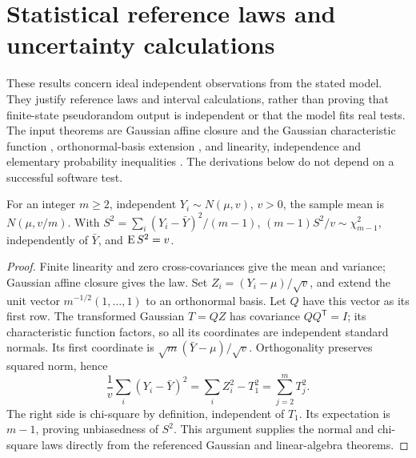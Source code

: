 \chapter{Statistical reference laws and uncertainty calculations}
\label{sec:shared-statistical-methods}
\label{sec:simulation-statistical-methods}

These results concern ideal independent observations from the stated model.
They justify reference laws and interval calculations, rather than proving
that finite-state pseudorandom output is independent or that the model fits
real tests. The input theorems are Gaussian affine closure and the Gaussian
characteristic function \citep[Theorems 3.3.1--3.3.2]{gallager2013},
orthonormal-basis extension \citep[Theorem 6.36]{axler2024}, and linearity,
independence and elementary probability inequalities
\citep[Sections 1.6, 2.1 and 3.4]{durrett2019}. The derivations below do
not depend on a successful software test.

\begin{proposition}
\label{sm:normal-sample}
For an integer \(m\geq2\), independent \(Y_i\sim N(\mu,v)\), \(v>0\),
the sample mean is \(N(\mu,v/m)\). With
\(S^2=\sum_i(Y_i-\bar Y)^2/(m-1)\),
\((m-1)S^2/v\sim\chi^2_{m-1}\), independently of \(\bar Y\), and
\(\operatorname{E} S^2=v\).
\end{proposition}
\begin{proof}
Finite linearity and zero cross-covariances give the mean and variance;
Gaussian affine closure gives the law. Set \(Z_i=(Y_i-\mu)/\sqrt v\),
and extend the unit vector \(m^{-1/2}(1,\ldots,1)\) to an orthonormal
basis. Let \(Q\) have this vector as its first row. The transformed
Gaussian \(T=QZ\) has covariance \(QQ^{\mathsf T}=I\); its characteristic
function factors, so all its coordinates are independent standard normals.
Its first coordinate is \(\sqrt m(\bar Y-\mu)/\sqrt v\). Orthogonality
preserves squared norm, hence
\[
 \frac{1}{v}\sum_i(Y_i-\bar Y)^2
 =\sum_iZ_i^2-T_1^2=\sum_{j=2}^mT_j^2.
\]
The right side is chi-square by definition, independent of \(T_1\).
Its expectation is \(m-1\), proving unbiasedness of \(S^2\).
This argument supplies the normal and chi-square laws directly from the
referenced Gaussian and linear-algebra theorems.
\end{proof}

